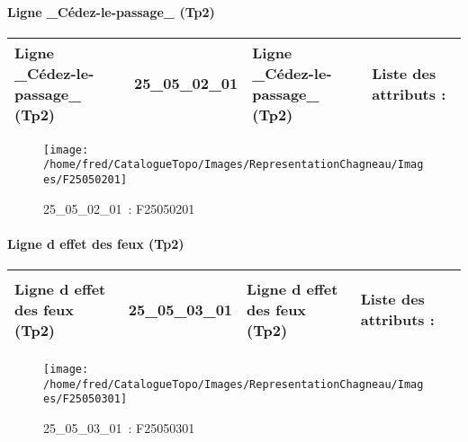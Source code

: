 \documentclass[12pt,titlepage,oneside]{book}
\begin{document}
\paragraph{Ligne \_Cédez-le-passage\_ (Tp2)}
\noindent
\vspace{\baselineskip}

\renewcommand{\arraystretch}{1.2}
\begin{supertabular}{|p{10cm}|c|p{13cm}|p{12cm}|}
 Ligne \_Cédez-le-passage\_ (Tp2) & 25\_05\_02\_01 & Ligne \_Cédez-le-passage\_ (Tp2) & Liste des attributs :
\begin{enumerate}
\end{enumerate}
\\
\hline
\end{supertabular}
\begin{figure}[h!]
  \hfill         %
  \begin{minipage}[t]{3cm}
    \begin{center}
      \texttt{[image: /home/fred/CatalogueTopo/Images/RepresentationChagneau/Images/F25050201]}
      \caption[~25\_05\_02\_01]{\small{25\_05\_02\_01~:} \tiny{F25050201}}\label{F25050201}
    \end{center}
  \end{minipage}
\end{figure}


\paragraph{Ligne d effet des feux (Tp2)}
\noindent
\vspace{\baselineskip}

\renewcommand{\arraystretch}{1.2}
\begin{supertabular}{|p{10cm}|c|p{13cm}|p{12cm}|}
 Ligne d effet des feux (Tp2) & 25\_05\_03\_01 & Ligne d effet des feux (Tp2) & Liste des attributs :
\begin{enumerate}
\end{enumerate}
\\
\hline
\end{supertabular}
\begin{figure}[h!]
  \hfill         %
  \begin{minipage}[t]{3cm}
    \begin{center}
      \texttt{[image: /home/fred/CatalogueTopo/Images/RepresentationChagneau/Images/F25050301]}
      \caption[~25\_05\_03\_01]{\small{25\_05\_03\_01~:} \tiny{F25050301}}\label{F25050301}
    \end{center}
  \end{minipage}
\end{figure}
\end{document}
